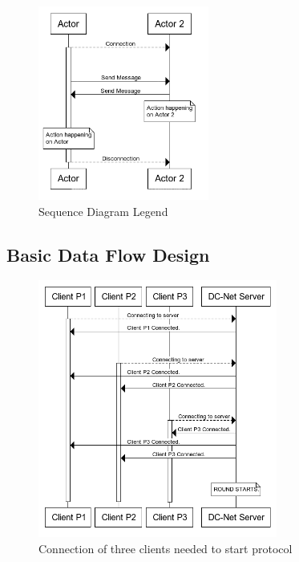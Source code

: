 \begin{figure}[H]
    \centering
    \includegraphics[width=0.5\textwidth]{Images/Design/seqDiagramLegend.png}
    \caption{Sequence Diagram Legend}
    \label{fig:sequenceDiagramLegend}
\end{figure}


\subsection{Basic Data Flow Design}

\begin{figure}[H]
    \centering
    \includegraphics[width=0.7\textwidth]{Images/Design/clientsConnection.png}
    \caption{Connection of three clients needed to start protocol}
    \label{fig:clientsConnection}
\end{figure}

